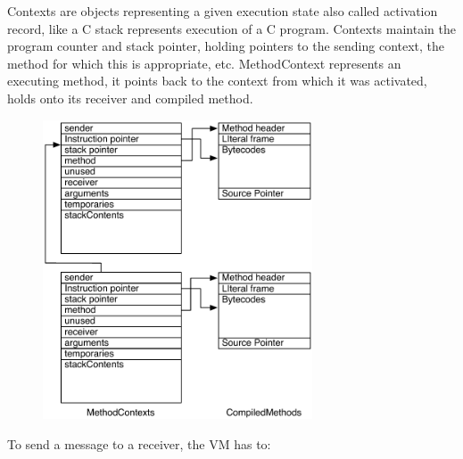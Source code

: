 \documentclass[a4paper,10pt,twoside]{book}
\begin{document}
Contexts are objects representing a given execution state also called activation record, like a C stack represents execution of a C program. Contexts maintain the program counter and stack pointer, holding pointers to the sending context, the method for which this is appropriate, etc. MethodContext represents an executing method, it points back to the context from which it was activated, holds onto its receiver and compiled method. 

\begin{figure}
\begin{center}
\includegraphics[width=8cm]{MethodAndMethodContext}
\end{center}
\end{figure}

To send a message to a receiver, the VM has to:
\end{document}
